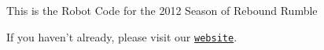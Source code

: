 \begin{DoxyVerb}This is the Robot Code for the 2012 Season of Rebound Rumble
\end{DoxyVerb}


If you haven't already, please visit our \href{http://www.amhsrobotics.com}{\tt website}. 